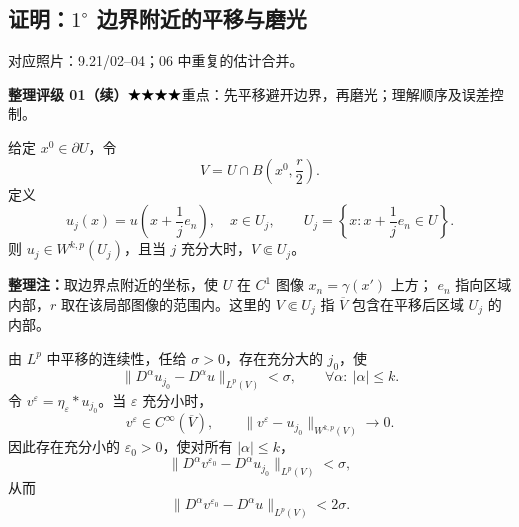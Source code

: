 \documentclass[UTF8,a4paper,11pt,fontset=fandol]{ctexart}
\newcommand{\ednote}[1]{\par{\small\color{notegray}\textbf{整理注：}#1}\par}
\newcommand{\source}[1]{{\small\color{notegray}对应照片：#1。}\par}
\newcommand{\proofstars}[1]{\ensuremath{%
\ifnum#1>0\relax\bigstar\fi
\ifnum#1>1\relax\bigstar\fi
\ifnum#1>2\relax\bigstar\fi
\ifnum#1>3\relax\bigstar\fi
\ifnum#1>4\relax\bigstar\fi}}
\newcommand{\proofrating}[3]{\par{\small\color{proofblue}%
\textbf{整理评级 #1}\enspace\proofstars{#2}\quad #3\par}}
\begin{document}
\newpage
\subsection*{证明：$1^\circ$ 边界附近的平移与磨光}
\source{9.21/02--04；06 中重复的估计合并}
\proofrating{01（续）}{4}{重点：先平移避开边界，再磨光；理解顺序及误差控制。}
给定 $x^0\in\partial U$，令
\[
V=U\cap B\left(x^0,\frac r2\right).
\]
定义
\[
u_j(x)=u\left(x+\frac1j e_n\right),\quad x\in U_j,\qquad
U_j=\left\{x:x+\frac1j e_n\in U\right\}.
\]
则 $u_j\in W^{k,p}(U_j)$，且当 $j$ 充分大时，$V\Subset U_j$。
\ednote{取边界点附近的坐标，使 $U$ 在 $C^1$ 图像 $x_n=\gamma(x')$ 上方；
$e_n$ 指向区域内部，$r$ 取在该局部图像的范围内。这里的 $V\Subset U_j$ 指
$\overline V$ 包含在平移后区域 $U_j$ 的内部。}
\begin{center}
\end{center}
由 $L^p$ 中平移的连续性，任给 $\sigma>0$，存在充分大的 $j_0$，使
\[
\|D^\alpha u_{j_0}-D^\alpha u\|_{L^p(V)}<\sigma,
\qquad\forall\alpha:\ |\alpha|\leq k.
\]
令 $v^\varepsilon=\eta_\varepsilon*u_{j_0}$。当 $\varepsilon$ 充分小时，
\[
v^\varepsilon\in C^\infty(\overline V),\qquad
\|v^\varepsilon-u_{j_0}\|_{W^{k,p}(V)}\longrightarrow0.
\]
因此存在充分小的 $\varepsilon_0>0$，使对所有 $|\alpha|\leq k$，
\[
\|D^\alpha v^{\varepsilon_0}-D^\alpha u_{j_0}\|_{L^p(V)}<\sigma,
\]
从而
\[
\boxed{\|D^\alpha v^{\varepsilon_0}-D^\alpha u\|_{L^p(V)}<2\sigma.}
\]

\newpage
\end{document}
